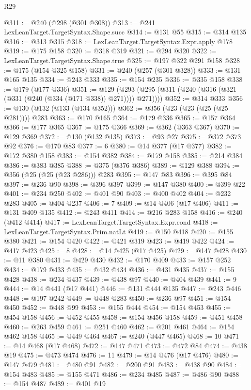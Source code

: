 \begin{lexlean}{R29}
\begin{coremodule}
@311 := @240 (@298 (@301 @308))
@313 := @241 LexLeanTarget.TargetSyntax.Shape.succ
@314 := @131 @55
@315 := @314 @135
@316 := @313 @315
@318 := LexLeanTarget.TargetSyntax.Expr.apply @178
@319 := @175 @158
@320 := @318 @319
@321 := @294 @320
@322 := LexLeanTarget.TargetSyntax.Shape.true
@325 := @197 @322 @291 @158
@328 := @175 (@154 @325 @158)
@331 := @240 (@257 (@301 @328))
@333 := @131 @165 @135
@334 := @243 @333
@335 := @154 @235
@336 := @335 @158
@338 := @179 (@177 @336)
@351 := @129 (@293 (@295 (@311 (@240 (@316 (@321 (@331 (@240 (@334 (@171 @338)) @271)))) @271))))
@352 := @314 @333
@356 := @130 (@132 (@133 (@134 @352)))
@362 := @356 (@23 (@23 (@25 (@25 @281)))) @283
@363 := @170 @165
@364 := @179 @336
@365 := @157 @364
@366 := @177 @365
@367 := @175 @366
@369 := @362 (@363 @367)
@370 := @129 @369
@372 := @130 (@132 @135)
@373 := @93 @27
@375 := @372 @373 @92
@376 := @170 @83
@377 := 6
@380 := @14 @377 (@17 @377)
@382 := @172 @380 @158
@383 := @154 @382
@384 := @179 @158
@385 := @214 @384
@386 := @383 @385
@388 := @375 (@376 @386)
@389 := @129 @388
@394 := @356 (@25 (@25 (@23 @286))) @283
@395 := @147 @83
@396 := @395 @84
@397 := @236 @90
@398 := @396 @397
@399 := @147 @380
@400 := @399 @22
@401 := @234 @250
@402 := @401 @90
@403 := @400 @402
@404 := @232 @283
@405 := @404 @237
@406 := 7
@409 := @14 @406 (@17 @406)
@411 := @131 @409 @135
@412 := @243 @411
@414 := @216 @283 @158
@416 := @240 (@412 @414)
@417 := LexLeanTarget.TargetSyntax.Expr.cond
@418 := LexLeanTarget.TargetSyntax.Prim.natLt
@419 := @150 @418
@420 := @155 @380
@421 := @154 @420
@422 := @421 @319
@423 := @419 @422
@424 := @417 @423
@425 := 8
@428 := @14 @425 (@17 @425)
@429 := @147 @428
@430 := @11 @380
@431 := @429 @430
@432 := @170 @409
@433 := @157 @252
@434 := @179 @433
@435 := @432 @434
@436 := @431 @435
@437 := @155 @428
@438 := @234 @437
@439 := @438 @97
@440 := @404 @439
@441 := 9
@444 := @14 @441 (@17 @441)
@446 := @131 @444 @135
@447 := @243 @446
@448 := @197 @242
@449 := @448 @283
@450 := @236 @97
@451 := @154 @450
@452 := @448 @99
@453 := @155 @444
@454 := @154 @453
@455 := @454 @158
@456 := @452 @455
@458 := @154 @456 @158
@459 := @451 @458
@460 := @263 @459
@461 := @251 @460
@462 := @201 @461
@464 := @154 @462 @158
@465 := @449 @464
@467 := @240 (@447 @465)
@468 := 10
@471 := @14 @468 (@17 @468)
@472 := @147 @471
@473 := @472 @84
@474 := @438 @19
@475 := @473 @474
@476 := 11
@479 := @14 @476 (@17 @476)
@480 := @147 @479
@481 := @480 @91
@482 := @200 @91
@483 := @438 @90
@484 := @154 @483
@485 := @155 @471
@486 := @234 @485
@487 := @486 @90
@488 := @154 @487
@489 := @401 @19

\end{coremodule}
\end{lexlean}
